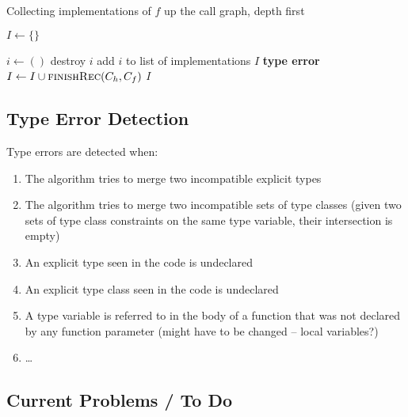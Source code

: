 \documentclass[10pt]{article}
\begin{document}
\begin{algorithm}
	\caption{Collecting implementations of $f$ up the call graph, depth first}
	\begin{algorithmic}[1]
			\State $I \gets \{\}$ 
			 

				\State $i \gets ()$ 
				 
						\State {}
					\Else
						\State destroy $i$
					\EndIf
				\EndFor
					\State add $i$ to list of implementations $I$
				\EndIf
					\State \Return \textbf{type error} 
				\EndIf
				\State $I \gets I \cup \Call{finishRec}{C_h, C_f}$
			\EndFor
			\State \Return $I$
		\EndFunction
	\end{algorithmic}
\end{algorithm}

\subsection{Type Error Detection}

Type errors are detected when:
\begin{enumerate}
	\item The algorithm tries to merge two incompatible explicit types
	\item The algorithm tries to merge two incompatible sets of type classes
		(given two sets of type class constraints on the same type variable,
		their intersection is empty) 
	\item An explicit type seen in the code is undeclared
	\item An explicit type class seen in the code is undeclared
	\item A type variable is referred to in the body of a function that was not
		declared by any function parameter (might have to be changed -- local
		variables?)
	\item \ldots
\end{enumerate}


\pagebreak
\subsection{Current Problems / To Do}
\end{document}
